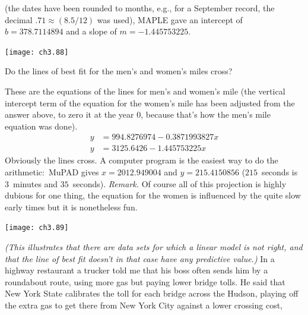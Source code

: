 \begin{exercises}
\begin{answer}
     (the dates have been rounded to months, e.g., for a September record,
     the decimal $.71\approx (8.5/12)$ was used),
     MAPLE gave an intercept of $b=378.7114894$ and a slope of 
    $m=-1.445753225$.
    \begin{center}  \small
      \texttt{[image: ch3.88]}
    \end{center}
   \end{answer}   
  \item 
  Do the lines of best fit for the men's and women's miles cross?
  \begin{answer}
    These are the equations of the lines for men's and women's mile 
    (the vertical intercept term of the equation
    for the women's mile has been adjusted from the answer above,
    to zero it at the year $0$,
    because that's how the men's mile equation was done).
    \begin{align*}
        y &=994.8276974-0.3871993827x  \\
        y &=3125.6426-1.445753225x
    \end{align*}
    Obviously the lines cross.
    A computer program  is the easiest way to do the
    arithmetic:~MuPAD gives $x=2012.949004$ and $y=215.4150856$
    ($215$~seconds is $3$~minutes and $35$~seconds).
    \textit{Remark.}
    Of course all of this projection is highly dubious \Dash  for one thing,
    the equation for the women is influenced by the quite slow early 
    times \Dash  but it is nonetheless fun.
     \begin{center}  \small
       \texttt{[image: ch3.89]}
     \end{center}
  \end{answer}
  \item
    \textit{(This illustrates that there are data sets for which a 
    linear model is not right,  and that the line of best fit doesn't
    in that case have any predictive value.)} 
    In a highway restaurant a trucker told me that his boss often sends 
    him by a roundabout route, using more gas
    but paying lower bridge tolls.
    He said that New York State calibrates the 
    toll for each bridge across the Hudson, 
    playing off the extra gas to get there
    from New York City against a lower crossing cost,

\end{exercises}

